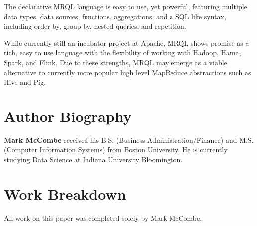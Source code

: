 \documentclass[9pt,twocolumn,twoside]{../../styles/osajnl}
\begin{document}
The declarative MRQL language is easy to use, yet powerful, featuring multiple data types, data sources, functions, aggregations, and a SQL like syntax, including order by, group by, nested queries, and repetition. 

While currently still an incubator project at Apache, MRQL shows promise as a rich, easy to use language with the flexibility of working with Hadoop, Hama, Spark, and Flink.  Due to these strengths, MRQL may emerge as a viable alternative to currently more popular high level MapReduce abstractions such as Hive and Pig.




 
\section*{Author Biography}
\begingroup
\setlength\intextsep{0pt}
\begin{minipage}[t][3.2cm][t]{1.0\columnwidth} %
  \noindent
  {\bfseries Mark McCombe} received his B.S. (Business Administration/Finance) and M.S. (Computer Information Systems) from Boston University.  He is currently studying Data Science at Indiana University Bloomington.
\end{minipage}
\endgroup

\newpage

\appendix

\section{Work Breakdown}

All work on this paper was completed solely by Mark McCombe.
\end{document}
